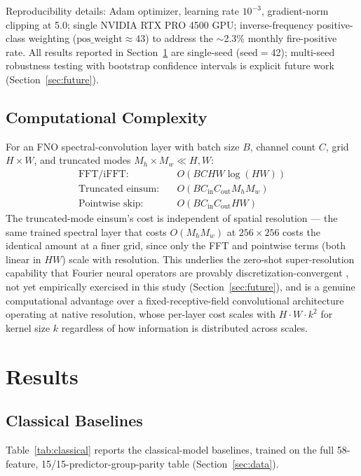 \documentclass[journal]{IEEEtran}
\begin{document}
Reproducibility details: Adam optimizer, learning rate $10^{-3}$, gradient-norm clipping at 5.0; single NVIDIA RTX PRO 4500 GPU; inverse-frequency positive-class weighting ($\mathrm{pos\_weight}\approx43$) to address the $\sim$2.3\% monthly fire-positive rate. All results reported in Section~\ref{sec:results} are single-seed (seed$=$42); multi-seed robustness testing with bootstrap confidence intervals is explicit future work (Section~\ref{sec:future}).

\subsection{Computational Complexity}

For an FNO spectral-convolution layer with batch size $B$, channel count $C$, grid $H\times W$, and truncated modes $M_h\times M_w \ll H,W$:
\begin{align}
\text{FFT/iFFT:} &\quad O(BCHW\log(HW)) \\
\text{Truncated einsum:} &\quad O(BC_{\mathrm{in}}C_{\mathrm{out}}M_hM_w) \\
\text{Pointwise skip:} &\quad O(BC_{\mathrm{in}}C_{\mathrm{out}}HW)
\end{align}
The truncated-mode einsum's cost is independent of spatial resolution --- the same trained spectral layer that costs $O(M_hM_w)$ at $256\times256$ costs the identical amount at a finer grid, since only the FFT and pointwise terms (both linear in $HW$) scale with resolution. This underlies the zero-shot super-resolution capability that Fourier neural operators are provably discretization-convergent \cite{li2023pino,kovachki2021}, not yet empirically exercised in this study (Section~\ref{sec:future}), and is a genuine computational advantage over a fixed-receptive-field convolutional architecture operating at native resolution, whose per-layer cost scales with $H\cdot W\cdot k^2$ for kernel size $k$ regardless of how information is distributed across scales.


\section{Results}
\label{sec:results}

\subsection{Classical Baselines}

Table~\ref{tab:classical} reports the classical-model baselines, trained on the full 58-feature, 15/15-predictor-group-parity table (Section~\ref{sec:data}).
\end{document}
